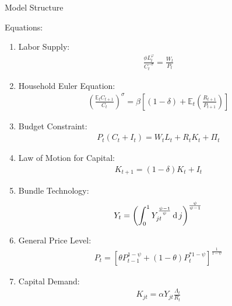 \documentclass[../quali_slides.tex]{subfiles}
\begin{document}

\begin{frame}[allowframebreaks]{Model Structure}

	{\singlespacing

Equations:

\begin{enumerate}
	\item Labor Supply:
	\begin{align}
		\frac{\phi L_t^{\varphi}}{C_t^{-\sigma}} = \frac{W_t}{P_t}
	\end{align}
	
	\item Household Euler Equation:
	\begin{align}
		\left( \frac{\mathbb{E}_t C_{t+1}}{C_t} \right)^\sigma = \beta \left[ (1-\delta) + \mathbb{E}_t \left(\frac{R_{t+1}}{P_{t+1}}\right) \right]
	\end{align}
	
	\item Budget Constraint: 
	\begin{align}
		P_t (C_t + I_t) = W_t L_t + R_t K_t + \Pi_t
	\end{align}
	
	\item Law of Motion for Capital:
	\begin{align}
		K_{t+1} = (1-\delta)K_t + I_t
	\end{align}
	
	\item Bundle Technology:
	\begin{align}
		Y_t = \left( \int_{0}^{1} Y_{jt}^{\frac{\psi-1}{\psi}} \operatorname{d} j \right)^{\frac{\psi}{\psi-1}}
	\end{align}
	
	\item General Price Level:
	\begin{align}
		P_t = \left[ \theta P_{t-1}^{1-\psi} + (1-\theta) P_t^{\ast 1-\psi} \right]^\frac{1}{1-\psi}
	\end{align}
	
	\item Capital Demand:
	\begin{align}
		K_{jt} = \alpha Y_{jt} \frac{\Lambda_t}{R_t}
	\end{align}
	

\end{enumerate}}
\end{frame}
\end{document}
